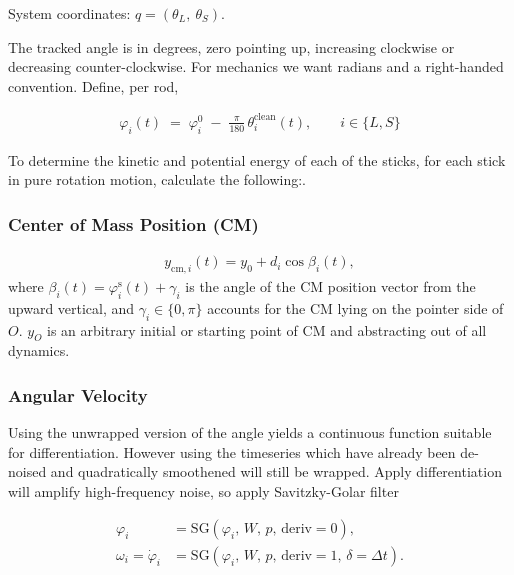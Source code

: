 \documentclass[letterpaper, 10pt, conference]{IEEEtran}
\begin{document}
                 System coordinates: $q = (\theta_L,\ \theta_S)$.

                 The tracked angle is in degrees, zero pointing up, increasing clockwise or decreasing counter-clockwise. For mechanics we want radians and a right-handed convention. Define, per rod,

                 \begin{align}
                     \varphi_i(t) \;=\; \varphi_i^{0} \;-\; \frac{\pi}{180}\,\theta_i^{\text{clean}}(t),
                     \qquad i \in \{L, S\}
                 \end{align}

                 To determine the kinetic and potential energy of each of the sticks, for each stick in pure rotation motion, calculate the following:.
                \subsubsection{Center of Mass Position (CM)}
                    \begin{align}
                        y_{\mathrm{cm},i}(t) = y_0 + d_i\cos\beta_i(t), 
                    \end{align}
                    where $\beta_i(t) = \varphi_i^{\text{s}}(t) + \gamma_i$ is the angle of the CM position vector from the upward vertical, and $\gamma_i \in \{0,\pi\}$ accounts for the CM lying on the pointer side of $O$. $y_O$ is an arbitrary initial or starting point of CM and abstracting out of all dynamics.
                
                \subsubsection{\textbf{Angular Velocity}}
                    Using the unwrapped version of the angle yields a continuous function suitable for differentiation. However using the timeseries which have already been de-noised and quadratically smoothened will still be wrapped. Apply differentiation will amplify high-frequency noise, so apply Savitzky-Golar filter %

                    \begin{align}
                        \varphi_i &= \mathrm{SG}\!\left(\varphi_i,\, W,\, p,\, \text{deriv}=0\right), \\
                        \omega_i = \dot{\varphi}_i
                        &= \mathrm{SG}\!\left(\varphi_i,\, W,\, p,\, \text{deriv}=1,\, \delta=\Delta t\right).
                    \end{align}
            
\end{document}
